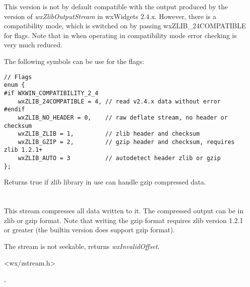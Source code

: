 This version is not by default compatible with the output produced by
the version of {\it wxZlibOutputStream} in wxWidgets 2.4.x. However,
there is a compatibility mode, which is switched on by passing
wxZLIB\_24COMPATIBLE for flags. Note that in when operating in compatibility
mode error checking is very much reduced.

The following symbols can be use for the flags:

\begin{verbatim}
// Flags
enum {
#if WXWIN_COMPATIBILITY_2_4
    wxZLIB_24COMPATIBLE = 4, // read v2.4.x data without error
#endif
    wxZLIB_NO_HEADER = 0,    // raw deflate stream, no header or checksum
    wxZLIB_ZLIB = 1,         // zlib header and checksum
    wxZLIB_GZIP = 2,         // gzip header and checksum, requires zlib 1.2.1+
    wxZLIB_AUTO = 3          // autodetect header zlib or gzip
};
\end{verbatim}

\label{wxzlibinputstreamcanhandlegzip}


Returns true if zlib library in use can handle gzip compressed data.

\section{}\label{wxzliboutputstream}

This stream compresses all data written to it. The compressed output can be
in zlib or gzip format.
Note that writing the gzip format requires zlib version 1.2.1 or greater
(the builtin version does support gzip format).

The stream is not seekable,  returns
 {\it wxInvalidOffset}.




<wx/zstream.h>


,



